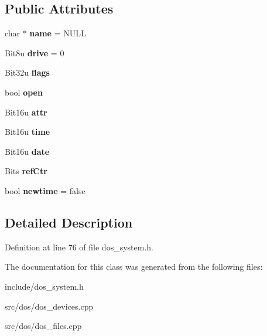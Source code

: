 \subsection*{Public Attributes}
\begin{DoxyCompactItemize}
\item 
\hypertarget{classDOS__File_a3e326c162b838b065ee83c27a112be65}{char $\ast$ {\bfseries name} = N\-U\-L\-L}\label{classDOS__File_a3e326c162b838b065ee83c27a112be65}

\item 
\hypertarget{classDOS__File_a253253ed788a32410df6b9ecc638366f}{Bit8u {\bfseries drive} = 0}\label{classDOS__File_a253253ed788a32410df6b9ecc638366f}

\item 
\hypertarget{classDOS__File_a2b1d061b180a8953a2e8a8ebc4021965}{Bit32u {\bfseries flags}}\label{classDOS__File_a2b1d061b180a8953a2e8a8ebc4021965}

\item 
\hypertarget{classDOS__File_a242898b780b6ca73db43631d1976caa6}{bool {\bfseries open}}\label{classDOS__File_a242898b780b6ca73db43631d1976caa6}

\item 
\hypertarget{classDOS__File_a8887614fa27d3180810eafb8c71f28fc}{Bit16u {\bfseries attr}}\label{classDOS__File_a8887614fa27d3180810eafb8c71f28fc}

\item 
\hypertarget{classDOS__File_aa15d5348eadb19dff76ce4b018504190}{Bit16u {\bfseries time}}\label{classDOS__File_aa15d5348eadb19dff76ce4b018504190}

\item 
\hypertarget{classDOS__File_aa1425a8936805dd77cfe74b353d39049}{Bit16u {\bfseries date}}\label{classDOS__File_aa1425a8936805dd77cfe74b353d39049}

\item 
\hypertarget{classDOS__File_ab3d966fce7a4b7f3b5c691a6d8a3249b}{Bits {\bfseries ref\-Ctr}}\label{classDOS__File_ab3d966fce7a4b7f3b5c691a6d8a3249b}

\item 
\hypertarget{classDOS__File_a9a1cf63a07117706b255cc89a1183d23}{bool {\bfseries newtime} = false}\label{classDOS__File_a9a1cf63a07117706b255cc89a1183d23}

\end{DoxyCompactItemize}


\subsection{Detailed Description}


Definition at line 76 of file dos\-\_\-system.\-h.



The documentation for this class was generated from the following files\-:\begin{DoxyCompactItemize}
\item 
include/dos\-\_\-system.\-h\item 
src/dos/dos\-\_\-devices.\-cpp\item 
src/dos/dos\-\_\-files.\-cpp\end{DoxyCompactItemize}
